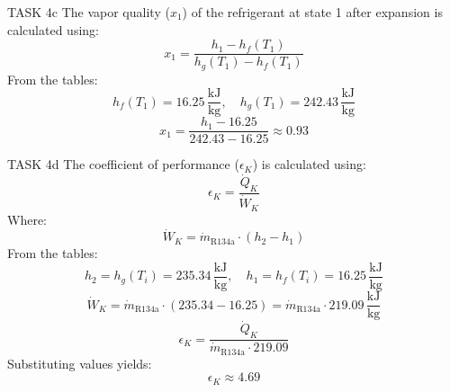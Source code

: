 TASK 4c  
The vapor quality (\(x_1\)) of the refrigerant at state 1 after expansion is calculated using:  
\[
x_1 = \frac{h_1 - h_f(T_1)}{h_g(T_1) - h_f(T_1)}
\]  
From the tables:  
\[
h_f(T_1) = 16.25 \, \frac{\text{kJ}}{\text{kg}}, \quad h_g(T_1) = 242.43 \, \frac{\text{kJ}}{\text{kg}}
\]  
\[
x_1 = \frac{h_1 - 16.25}{242.43 - 16.25} \approx 0.93
\]

TASK 4d  
The coefficient of performance (\(\epsilon_K\)) is calculated using:  
\[
\epsilon_K = \frac{\dot{Q}_K}{\dot{W}_K}
\]  
Where:  
\[
\dot{W}_K = \dot{m}_{\text{R134a}} \cdot (h_2 - h_1)
\]  
From the tables:  
\[
h_2 = h_g(T_i) = 235.34 \, \frac{\text{kJ}}{\text{kg}}, \quad h_1 = h_f(T_i) = 16.25 \, \frac{\text{kJ}}{\text{kg}}
\]  
\[
\dot{W}_K = \dot{m}_{\text{R134a}} \cdot (235.34 - 16.25) = \dot{m}_{\text{R134a}} \cdot 219.09 \, \frac{\text{kJ}}{\text{kg}}
\]  
\[
\epsilon_K = \frac{\dot{Q}_K}{\dot{m}_{\text{R134a}} \cdot 219.09}
\]  
Substituting values yields:  
\[
\epsilon_K \approx 4.69
\]